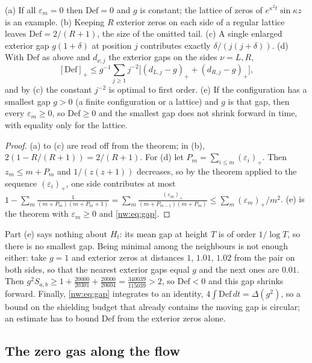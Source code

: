\begin{corollary}\label{nw:cor:shield}
(a) If all $\varepsilon_m=0$ then $\mathrm{Def}=0$ and $g$ is constant; the lattice of zeros of $e^{\kappa^2t}\sin\kappa z$ is an example. (b) Keeping $R$ exterior zeros on each side of a regular lattice leaves $\mathrm{Def}=2/(R+1)$, the size of the omitted tail. (c) A single enlarged exterior gap $g(1+\delta)$ at position $j$ contributes exactly $\delta/(j(j+\delta))$. (d) With $\mathrm{Def}$ as above and $d_{\nu,j}$ the exterior gaps on the sides $\nu=L,R$,
\[
[\mathrm{Def}]_+\le g^{-1}\sum_{j\ge1}j^{-2}\bigl[(d_{L,j}-g)_++(d_{R,j}-g)_+\bigr],
\]
and by (c) the constant $j^{-2}$ is optimal to first order. (e) If the configuration has a smallest gap $g>0$ (a finite configuration or a lattice) and $g$ is that gap, then every $\varepsilon_m\ge0$, so $\mathrm{Def}\ge0$ and the smallest gap does not shrink forward in time, with equality only for the lattice.
\end{corollary}

\begin{proof}
(a) to (c) are read off from the theorem; in (b), $2(1-R/(R+1))=2/(R+1)$. For (d) let $P_m=\sum_{i\le m}(\varepsilon_i)_+$. Then $z_m\le m+P_m$ and $1/(z(z+1))$ decreases, so by the theorem applied to the sequence $(\varepsilon_i)_+$, one side contributes at most $1-\sum_m\frac1{(m+P_m)(m+P_m+1)}=\sum_m\frac{(\varepsilon_m)_+}{(m+P_{m-1})(m+P_m)}\le\sum_m(\varepsilon_m)_+/m^2$. (e) is the theorem with $\varepsilon_m\ge0$ and \eqref{nw:eq:gap}.
\end{proof}

Part (e) says nothing about $H_t$: its mean gap at height $T$ is of order $1/\log T$, so there is no smallest gap. Being minimal among the neighbours is not enough either: take $g=1$ and exterior zeros at distances $1$, $1.01$, $1.02$ from the pair on both sides, so that the nearest exterior gaps equal $g$ and the next ones are $0.01$. Then $g^2S_{a,b}\ge1+\frac{20000}{20301}+\frac{20000}{20604}=\frac{340039}{115039}>2$, so $\mathrm{Def}<0$ and this gap shrinks forward. Finally, \eqref{nw:eq:gap} integrates to an identity, $4\int\mathrm{Def}\,dt=\Delta(g^2)$, so a bound on the shielding budget that already contains the moving gap is circular; an estimate has to bound $\mathrm{Def}$ from the exterior zeros alone.

\subsection{The zero gas along the flow}\label{cp:sec:gas}

